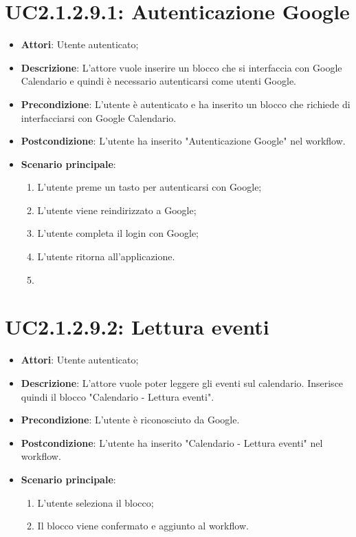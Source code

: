 \section{UC2.1.2.9.1: Autenticazione Google}
\label{UC2.1.2.9.1}
\begin{itemize}
	\item \textbf{Attori}: Utente autenticato;
	\item \textbf{Descrizione}: L'attore vuole inserire un blocco che si interfaccia con Google Calendario e quindi è necessario autenticarsi come utenti Google.
	\item \textbf{Precondizione}: L'utente è autenticato e ha inserito un blocco che richiede di interfacciarsi con Google Calendario.
	\item \textbf{Postcondizione}: L'utente ha inserito "Autenticazione Google" nel workflow.
	\item \textbf{Scenario principale}:
	\begin{enumerate} \item L'utente preme un tasto per autenticarsi con Google;  \item  L'utente viene reindirizzato a Google;  \item  L'utente completa il login con Google;  \item  L'utente ritorna all'applicazione.  \item \end{enumerate}
\end{itemize}

\section{UC2.1.2.9.2: Lettura eventi}
\label{UC2.1.2.9.2}
\begin{itemize}
	\item \textbf{Attori}: Utente autenticato;
	\item \textbf{Descrizione}: L'attore vuole poter leggere gli eventi sul calendario. Inserisce quindi il blocco "Calendario - Lettura eventi".
	\item \textbf{Precondizione}: L'utente è riconosciuto da Google.
	\item \textbf{Postcondizione}: L'utente ha inserito "Calendario - Lettura eventi" nel workflow.
	\item \textbf{Scenario principale}:
	\begin{enumerate} \item L'utente seleziona il blocco;  \item  Il blocco viene confermato e aggiunto al workflow.\end{enumerate}
\end{itemize}

